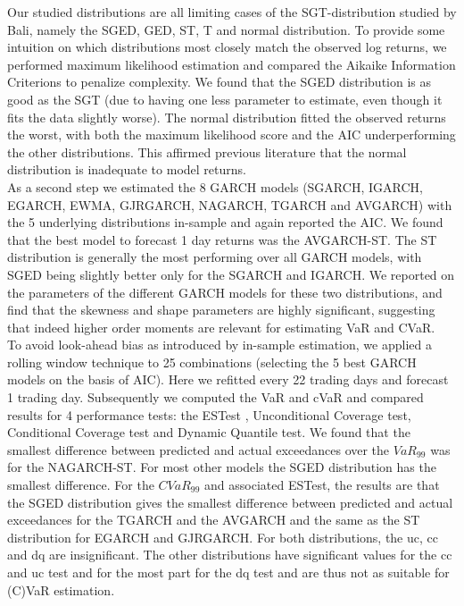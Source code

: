 \documentclass[a4paper, nobind]{templates/ociamthesis}
\begin{document}
\noindent Our studied distributions are all limiting cases of the SGT-distribution studied by Bali, namely the SGED, GED, ST, T and normal distribution. To provide some intuition on which distributions most closely match the observed log returns, we performed maximum likelihood estimation and compared the Aikaike Information Criterions to penalize complexity. We found that the SGED distribution is as good as the SGT (due to having one less parameter to estimate, even though it fits the data slightly worse). The normal distribution fitted the observed returns the worst, with both the maximum likelihood score and the AIC underperforming the other distributions. This affirmed previous literature that the normal distribution is inadequate to model returns.~\\

\noindent As a second step we estimated the 8 GARCH models (SGARCH, IGARCH, EGARCH, EWMA, GJRGARCH, NAGARCH, TGARCH and AVGARCH) with the 5 underlying distributions in-sample and again reported the AIC. We found that the best model to forecast 1 day returns was the AVGARCH-ST. The ST distribution is generally the most performing over all GARCH models, with SGED being slightly better only for the SGARCH and IGARCH. We reported on the parameters of the different GARCH models for these two distributions, and find that the skewness and shape parameters are highly significant, suggesting that indeed higher order moments are relevant for estimating VaR and CVaR.~\\

\noindent To avoid look-ahead bias as introduced by in-sample estimation, we applied a rolling window technique to 25 combinations (selecting the 5 best GARCH models on the basis of AIC). Here we refitted every 22 trading days and forecast 1 trading day. Subsequently we computed the VaR and cVaR and compared results for 4 performance tests: the ESTest \textcite{mcneil2000}, Unconditional Coverage test, Conditional Coverage test and Dynamic Quantile test. We found that the smallest difference between predicted and actual exceedances over the \(VaR_{99}\) was for the NAGARCH-ST. For most other models the SGED distribution has the smallest difference. For the \(CVaR_{99}\) and associated ESTest, the results are that the SGED distribution gives the smallest difference between predicted and actual exceedances for the TGARCH and the AVGARCH and the same as the ST distribution for EGARCH and GJRGARCH. For both distributions, the uc, cc and dq are insignificant. The other distributions have significant values for the cc and uc test and for the most part for the dq test and are thus not as suitable for (C)VaR estimation.~\\
\end{document}
